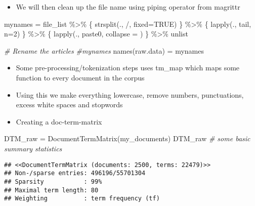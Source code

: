\documentclass[
  12pt,
]{article}
\newenvironment{Shaded}{\begin{snugshade}}{\end{snugshade}}
\newcommand{\AttributeTok}[1]{\textcolor[rgb]{0.77,0.63,0.00}{#1}}
\newcommand{\CommentTok}[1]{\textcolor[rgb]{0.56,0.35,0.01}{\textit{#1}}}
\newcommand{\ConstantTok}[1]{\textcolor[rgb]{0.00,0.00,0.00}{#1}}
\newcommand{\DecValTok}[1]{\textcolor[rgb]{0.00,0.00,0.81}{#1}}
\newcommand{\FunctionTok}[1]{\textcolor[rgb]{0.00,0.00,0.00}{#1}}
\newcommand{\NormalTok}[1]{#1}
\newcommand{\OtherTok}[1]{\textcolor[rgb]{0.56,0.35,0.01}{#1}}
\newcommand{\SpecialCharTok}[1]{\textcolor[rgb]{0.00,0.00,0.00}{#1}}
\newcommand{\StringTok}[1]{\textcolor[rgb]{0.31,0.60,0.02}{#1}}
\providecommand{\tightlist}{%
  \setlength{\itemsep}{0pt}\setlength{\parskip}{0pt}}
\begin{document}
\begin{itemize}
\tightlist
\item
  We will then clean up the file name using piping operator from
  magrittr
\end{itemize}

\begin{Shaded}
\begin{Highlighting}[]
\NormalTok{mynames }\OtherTok{=}\NormalTok{ file\_list }\SpecialCharTok{\%\textgreater{}\%}
\NormalTok{  \{ }\FunctionTok{strsplit}\NormalTok{(., }\StringTok{\textquotesingle{}/\textquotesingle{}}\NormalTok{, }\AttributeTok{fixed=}\ConstantTok{TRUE}\NormalTok{) \} }\SpecialCharTok{\%\textgreater{}\%}
\NormalTok{  \{ }\FunctionTok{lapply}\NormalTok{(., tail, }\AttributeTok{n=}\DecValTok{2}\NormalTok{) \} }\SpecialCharTok{\%\textgreater{}\%}
\NormalTok{  \{ }\FunctionTok{lapply}\NormalTok{(., paste0, }\AttributeTok{collapse =} \StringTok{\textquotesingle{}\textquotesingle{}}\NormalTok{) \} }\SpecialCharTok{\%\textgreater{}\%}
\NormalTok{  unlist}

\CommentTok{\# Rename the articles}
\CommentTok{\#mynames}
\FunctionTok{names}\NormalTok{(raw.data) }\OtherTok{=}\NormalTok{ mynames}
\end{Highlighting}
\end{Shaded}

\begin{itemize}
\item
  Some pre-processing/tokenization steps uses tm\_map which maps some
  function to every document in the corpus
\item
  Using this we make everything lowercase, remove numbers, punctuations,
  excess white spaces and stopwords
\item
  Creating a doc-term-matrix
\end{itemize}

\begin{Shaded}
\begin{Highlighting}[]
\NormalTok{DTM\_raw }\OtherTok{=} \FunctionTok{DocumentTermMatrix}\NormalTok{(my\_documents)}
\NormalTok{DTM\_raw }\CommentTok{\# some basic summary statistics}
\end{Highlighting}
\end{Shaded}

\begin{verbatim}
## <<DocumentTermMatrix (documents: 2500, terms: 22479)>>
## Non-/sparse entries: 496196/55701304
## Sparsity           : 99%
## Maximal term length: 80
## Weighting          : term frequency (tf)
\end{verbatim}
\end{document}
